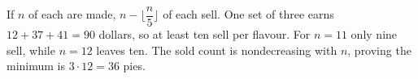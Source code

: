 If $n$ of each are made, $n-\lfloor\dfrac{n}{5}\rfloor$ of each sell. One set of three earns $12+37+41=90$ dollars, so at least ten sell per flavour. For $n=11$ only nine sell, while $n=12$ leaves ten. The sold count is nondecreasing with $n$, proving the minimum is $\boxed{3\cdot12=36}$ pies.
